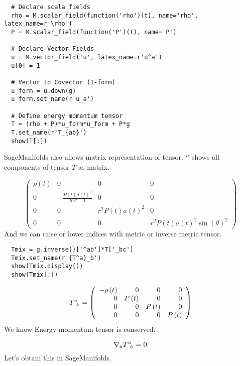 \documentclass[%
 reprint,
 amsmath,amssymb,
 aps,
]{revtex4-1}
\begin{document}
\begin{lstlisting}
  # Declare scala fields
  rho = M.scalar_field(function('rho')(t), name='rho', latex_name=r'\rho')
  P = M.scalar_field(function('P')(t), name='P')

  # Declare Vector Fields
  u = M.vector_field('u', latex_name=r'u^a')
  u[0] = 1

  # Vector to Covector (1-form)
  u_form = u.down(g)
  u_form.set_name(r'u_a')

  # Define energy momentum tensor
  T = (rho + P)*u_form*u_form + P*g
  T.set_name(r'T_{ab}')
  show(T[:])
\end{lstlisting}
SageManifolds also allows matrix representation of tensor. `'
shows all components of tensor $T$ as matrix. 

\begin{equation}
  \left(\begin{array}{rrrr}
\rho\left(t\right) & 0 & 0 & 0 \\
0 & -\frac{P\left(t\right) a\left(t\right)^{2}}{K r^{2} - 1} & 0 & 0 \\
0 & 0 & r^{2} P\left(t\right) a\left(t\right)^{2} & 0 \\
0 & 0 & 0 & r^{2} P\left(t\right) a\left(t\right)^{2} \sin\left({\theta}\right)^{2}
\end{array}\right)
\end{equation}
And we can raise or lower indices with metric or inverse metric tensor.
\begin{lstlisting}
  Tmix = g.inverse()['^ab']*T['_bc']
  Tmix.set_name(r'{T^a}_b')
  show(Tmix.display())
  show(Tmix[:])
\end{lstlisting}

\begin{equation}
  \tensor{T}{^a_b} = \left(\begin{array}{rrrr}
-\rho\left(t\right) & 0 & 0 & 0 \\
0 & P\left(t\right) & 0 & 0 \\
0 & 0 & P\left(t\right) & 0 \\
0 & 0 & 0 & P\left(t\right)
\end{array}\right)
\end{equation}
We know Energy momentum tensor is conserved.

\begin{equation}
  \nabla_a\tensor{T}{^a_b} = 0
\end{equation}
Let's obtain this in SageManifolds.

\newpage
\end{document}
